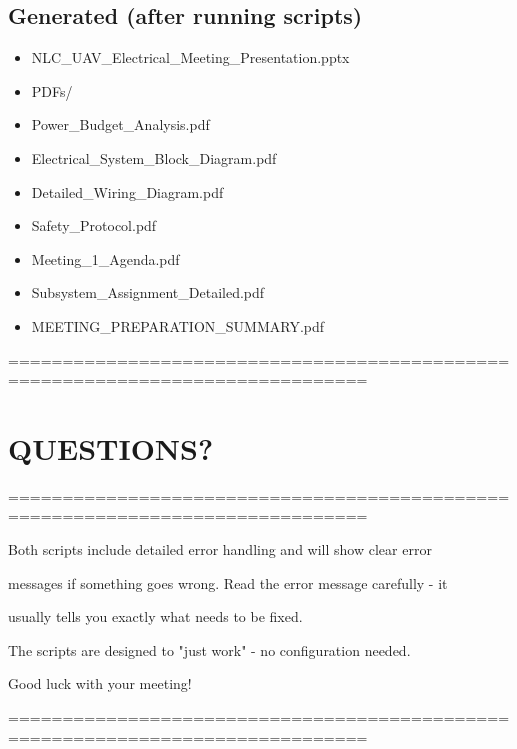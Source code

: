 \documentclass[11pt,letterpaper]{article}
\begin{document}
\subsection{Generated (after running scripts)}

\begin{itemize}
  \item NLC\_UAV\_Electrical\_Meeting\_Presentation.pptx
  \item PDFs/
  \item Power\_Budget\_Analysis.pdf
  \item Electrical\_System\_Block\_Diagram.pdf
  \item Detailed\_Wiring\_Diagram.pdf
  \item Safety\_Protocol.pdf
  \item Meeting\_1\_Agenda.pdf
  \item Subsystem\_Assignment\_Detailed.pdf
  \item MEETING\_PREPARATION\_SUMMARY.pdf
\end{itemize}

===============================================================================\par

\section{QUESTIONS?}

===============================================================================\par

Both scripts include detailed error handling and will show clear error\par

messages if something goes wrong. Read the error message carefully - it\par

usually tells you exactly what needs to be fixed.\par

The scripts are designed to "just work" - no configuration needed.\par

Good luck with your meeting!\par

===============================================================================\par
\end{document}
